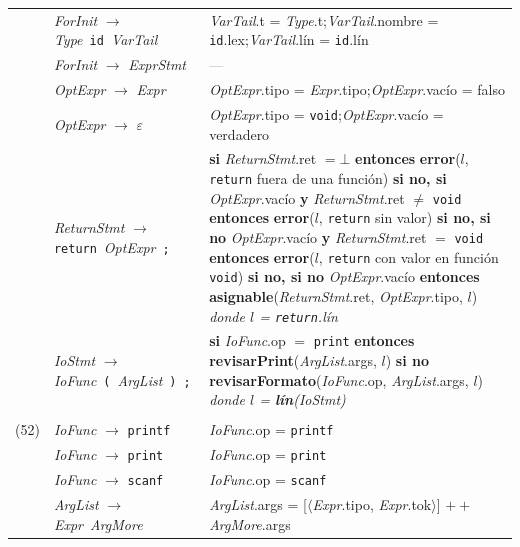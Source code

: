 \documentclass[11pt]{article}
\newcommand{\NT}[1]{\textcolor{ntcolor}{\textit{#1}}}            %
\newcommand{\T}[1]{\textcolor{tcolor}{\texttt{#1}}}              %
\newcommand{\A}[2]{\NT{#1}.\textsf{#2}}                          %
\newcommand{\fn}[1]{\textsf{\textbf{#1}}}                        %
\newcommand{\ty}[1]{\texttt{#1}}                                 %
\newcommand{\kw}[1]{\textbf{#1}}                                 %
\begin{document}
{\begin{longtable}{@{}r@{\hspace{6pt}}>{\raggedright\arraybackslash}p{5.6cm}@{\hspace{8pt}}>{\raggedright\arraybackslash}p{9.9cm}@{}}
\addlinespace[2pt]
{(46)} & \NT{ForInit} $\rightarrow$ \NT{Type}\ \T{id}\ \NT{VarTail} & \A{VarTail}{t} = \A{Type}{t};\quad \A{VarTail}{nombre} = \T{id}.\textsf{lex};\quad \A{VarTail}{lín} = \T{id}.\textsf{lín} \\
\addlinespace[2pt]
{(47)} & \NT{ForInit} $\rightarrow$ \NT{ExprStmt} & \textcolor{gray}{---} \\
\addlinespace[2pt]
{(48)} & \NT{OptExpr} $\rightarrow$ \NT{Expr} & \A{OptExpr}{tipo} = \A{Expr}{tipo};\quad \A{OptExpr}{vacío} = \textsf{falso} \\
\addlinespace[2pt]
{(49)} & \NT{OptExpr} $\rightarrow$ $\varepsilon$ & \A{OptExpr}{tipo} = \ty{void};\quad \A{OptExpr}{vacío} = \textsf{verdadero} \\
\addlinespace[2pt]
{(50)} & \NT{ReturnStmt} $\rightarrow$ \T{return}\ \NT{OptExpr}\ \T{;} & \kw{si} \A{ReturnStmt}{ret} $= \bot$ \kw{entonces} \fn{error}($l$, \T{return} fuera de una función) \newline \kw{si no, si} \A{OptExpr}{vacío} \kw{y} \A{ReturnStmt}{ret} $\neq$ \ty{void} \kw{entonces} \fn{error}($l$, \T{return} sin valor) \newline \kw{si no, si no} \A{OptExpr}{vacío} \kw{y} \A{ReturnStmt}{ret} $=$ \ty{void} \kw{entonces} \fn{error}($l$, \T{return} con valor en función \ty{void}) \newline \kw{si no, si no} \A{OptExpr}{vacío} \kw{entonces} \fn{asignable}(\A{ReturnStmt}{ret}, \A{OptExpr}{tipo}, $l$) \newline \textit{donde $l$ = \T{return}.\textsf{lín}} \\
\addlinespace[2pt]
{(51)} & \NT{IoStmt} $\rightarrow$ \NT{IoFunc}\ \T{(}\ \NT{ArgList}\ \T{)}\ \T{;} & \kw{si} \A{IoFunc}{op} $=$ \T{print} \kw{entonces} \fn{revisarPrint}(\A{ArgList}{args}, $l$) \newline \kw{si no} \fn{revisarFormato}(\A{IoFunc}{op}, \A{ArgList}{args}, $l$) \quad\textit{donde $l$ = \fn{lín}(\NT{IoStmt})} \\
\addlinespace[2pt]
\midrule
\multicolumn{3}{l}{\textbf{Entrada/salida y argumentos}} \\ \midrule
{(52)} & \NT{IoFunc} $\rightarrow$ \T{printf} & \A{IoFunc}{op} = \T{printf} \\
\addlinespace[2pt]
{(53)} & \NT{IoFunc} $\rightarrow$ \T{print} & \A{IoFunc}{op} = \T{print} \\
\addlinespace[2pt]
{(54)} & \NT{IoFunc} $\rightarrow$ \T{scanf} & \A{IoFunc}{op} = \T{scanf} \\
\addlinespace[2pt]
{(55)} & \NT{ArgList} $\rightarrow$ \NT{Expr}\ \NT{ArgMore} & \A{ArgList}{args} = [$\langle$\A{Expr}{tipo}, \A{Expr}{tok}$\rangle$] $\mathbin{+\!\!+}$ \A{ArgMore}{args} \\

\end{longtable}}
\end{document}
